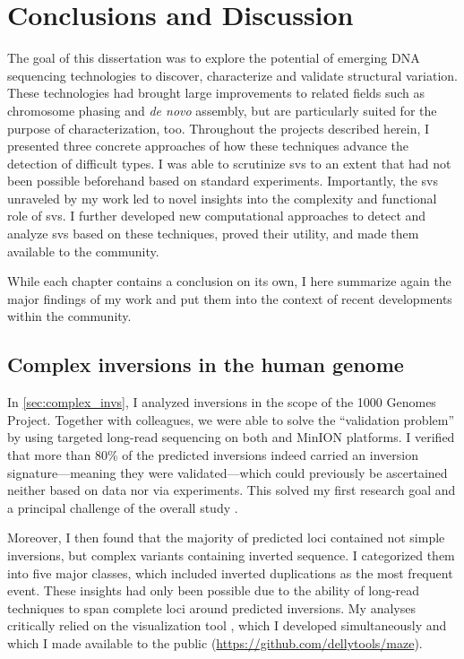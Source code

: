 \chapter{Conclusions and Discussion}
\label{sec:conclusions}

The goal of this dissertation was to explore the potential of emerging DNA
sequencing technologies to discover, characterize and validate structural
variation. These technologies had brought large improvements to related fields
such as chromosome phasing and \emph{de novo} assembly, but are particularly
suited for the purpose of \sv characterization, too.
Throughout the projects described herein, I presented three
concrete approaches of how these techniques advance the detection of difficult
\sv types. I was able to scrutinize \acp{sv} to an extent that had not been
possible beforehand based on standard \mps experiments. Importantly, the
\acp{sv} unraveled by my work led to novel insights into the complexity and
functional role
of \acp{sv}. I further developed new computational approaches to detect and
analyze \acp{sv} based on these techniques, proved their utility, and made
them available to the community.

While each chapter contains a conclusion on its own, I here summarize again the
major findings of my work and put them into the context of recent developments
within the community.



\section{Complex inversions in the human genome}

In \cref{sec:complex_invs}, I analyzed inversions in the scope of the 1000
Genomes Project. Together with colleagues, we were able to solve the
``validation problem'' by using targeted long-read sequencing on both \pacbio
and \ont MinION platforms. I verified that more than 80\% of the predicted
inversions indeed carried an inversion signature---meaning they were
validated---which could previously be ascertained neither based on \mps data nor
via \pcr experiments. This solved my first research goal and a principal
challenge of the overall study \citep{Sudmant2015}.

Moreover, I then found that
the majority of predicted loci contained not simple inversions, but complex
variants containing inverted sequence. I categorized them into five major
classes, which included inverted duplications as the most frequent event. These
insights had only been possible due to the ability of long-read techniques to
span complete loci around predicted inversions. My analyses critically relied on
the visualization tool \maze, which I developed simultaneously and which I made
available to the public (\url{https://github.com/dellytools/maze}).

